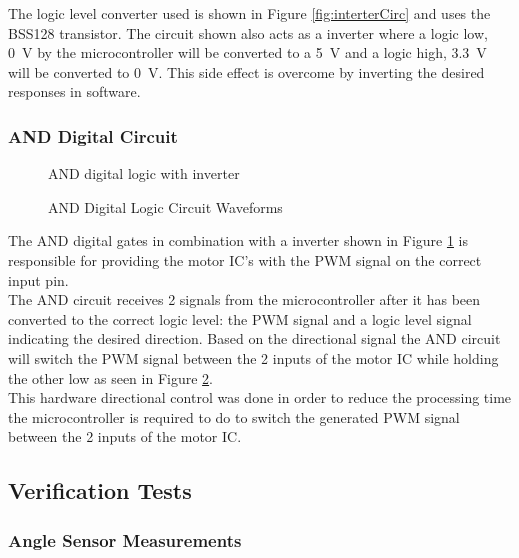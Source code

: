 The logic level converter used is shown in Figure \ref{fig:interterCirc} and uses the BSS128 transistor. The circuit shown also acts as a inverter where a logic low, \SI{0}{V} by the microcontroller will be converted to a \SI{5}{V} and a logic high, \SI{3.3}{V} will be converted to \SI{0}{V}. This side effect is overcome by inverting the desired responses in software.


\subsubsection{AND Digital Circuit}
\begin{figure}[h]
	\centering
	
	\caption{AND digital logic with inverter}
	\label{fig:andCircuit}
\end{figure}

\begin{figure}[h]
	\centering
	
	\caption{AND Digital Logic Circuit Waveforms}
	\label{fig:andCircuit_waveform}
\end{figure}

The AND digital gates in combination with a inverter shown in Figure \ref{fig:andCircuit} is responsible for providing the motor IC's with the PWM signal on the correct input pin.\\ 

The AND circuit receives 2 signals from the microcontroller  after it has been converted to the correct logic level: the PWM signal and a logic level signal indicating the desired direction. Based on the directional signal the AND circuit will switch the PWM signal between the 2 inputs of the motor IC while holding the other low as seen in Figure \ref{fig:andCircuit_waveform}.\\

This hardware directional control was done in order to reduce the processing time the microcontroller is required to do to switch the generated PWM signal between the 2 inputs of the motor IC.

\subsection{Verification Tests}

\subsubsection{Angle Sensor Measurements}

